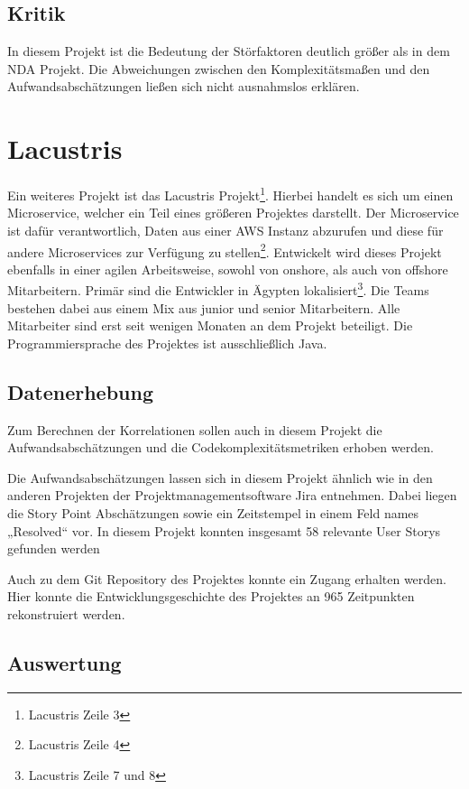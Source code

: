 \subsection{Kritik}\label{Alstonii-kritik}

In diesem Projekt ist die Bedeutung der Störfaktoren deutlich grö\ss er als
in dem NDA Projekt. Die Abweichungen zwischen den Komplexitätsma\ss en und
den Aufwandsabschätzungen lie\ss en sich nicht ausnahmslos erklären.

\section{Lacustris}\label{lacustris}

Ein weiteres Projekt ist das Lacustris Projekt\footnote{Lacustris
  Zeile 3}. Hierbei handelt es sich um einen Microservice, welcher ein
Teil eines grö\ss eren Projektes darstellt. Der Microservice ist dafür
verantwortlich, Daten aus einer \ac{AWS} Instanz abzurufen und diese für
andere Microservices zur Verfügung zu stellen\footnote{Lacustris Zeile 4}.
Entwickelt wird dieses Projekt ebenfalls in einer agilen Arbeitsweise,
sowohl von onshore, als auch von offshore Mitarbeitern. Primär sind die
Entwickler in Ägypten lokalisiert\footnote{Lacustris Zeile 7 und 8}. Die
Teams bestehen dabei aus einem Mix aus junior und senior Mitarbeitern.
Alle Mitarbeiter sind erst seit wenigen Monaten an dem Projekt
beteiligt. Die Programmiersprache des Projektes ist ausschlie\ss lich Java.

\subsection{Datenerhebung}\label{lm-Datenerhebung}

Zum Berechnen der Korrelationen sollen auch in diesem Projekt die
Aufwandsabschätzungen und die Codekomplexitätsmetriken erhoben werden.

Die Aufwandsabschätzungen lassen sich in diesem Projekt ähnlich wie in
den anderen Projekten der Projektmanagementsoftware Jira entnehmen.
Dabei liegen die Story Point Abschätzungen sowie ein Zeitstempel in
einem Feld names „Resolved`` vor. In diesem Projekt konnten insgesamt 58
relevante User Storys gefunden werden

Auch zu dem Git Repository des Projektes konnte ein Zugang erhalten
werden. Hier konnte die Entwicklungsgeschichte des Projektes an 965
Zeitpunkten rekonstruiert werden.

\subsection{Auswertung}\label{lm-Auswertung}

